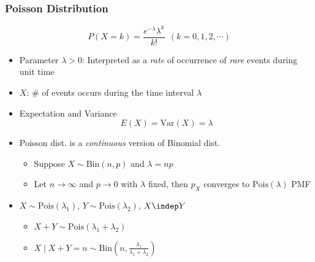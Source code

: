 \subsubsection*{Poisson Distribution}
\begin{equation}
    P(X=k)=\frac{e^{-\lambda}\lambda^k}{k!}~~(k=0,1,2,\cdots)
\end{equation}
\begin{itemize}
    \item Parameter $\lambda>0$: Interpreted as a \textit{rate} of occurrence of \textit{rare} events during unit time
    \item $X$: \# of events occurs during the time interval $\lambda$
    \item Expectation and Variance
    \begin{equation}
        E(X)=\text{Var}(X)=\lambda
    \end{equation}
    \item Poisson dist. is a \textit{continuous} version of Binomial dist.
    \begin{itemize}
        \item Suppose $X\sim\text{Bin}(n,p)$ and $\lambda=np$
        \item Let $n\to\infty$ and $p\to 0$ with $\lambda$ fixed, then $p_X$ converges to $\text{Pois}(\lambda)$ PMF
    \end{itemize}
    \item $X\sim\text{Pois}(\lambda_1)$, $Y\sim\text{Pois}(\lambda_2)$, $X\indep Y$
    \begin{itemize}
        \item $X+Y\sim\text{Pois}(\lambda_1+\lambda_2)$
        \item $X\mid X+Y=n\sim\text{Bin}\left(n,\frac{\lambda_1}{\lambda_1+\lambda_2}\right)$
    \end{itemize}
\end{itemize}

